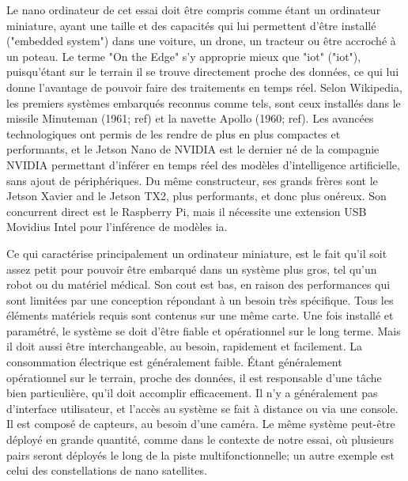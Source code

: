 ﻿\par Le nano ordinateur de cet essai doit être compris comme étant un ordinateur miniature, ayant une taille et des capacités qui lui permettent d'être installé ("embedded system") dans une voiture, un drone, un tracteur ou être accroché à un poteau. Le terme "On the Edge" s'y approprie mieux que "\acrshort{iot}" ("\acrlong{iot}"), puisqu'étant sur le terrain il se trouve directement proche des données, ce qui lui donne l'avantage de pouvoir faire des traitements en temps réel. Selon Wikipedia, les premiers systèmes embarqués reconnus comme tels, sont ceux installés dans le missile Minuteman (1961; ref) et la navette Apollo (1960; ref). Les avancées technologiques ont permis de les rendre de plus en plus compactes et performants, et le Jetson Nano de NVIDIA est le dernier né de la compagnie NVIDIA permettant d'inférer en temps réel des modèles d'intelligence artificielle, sans ajout de périphériques. Du même constructeur, ses grands frères sont le Jetson Xavier and le Jetson TX2, plus performants, et donc plus onéreux. Son concurrent direct est le Raspberry Pi, mais il nécessite une extension USB Movidius Intel pour l'inférence de modèles \acrshort{ia}. 
\par Ce qui caractérise principalement un ordinateur miniature, est le fait qu'il soit assez petit pour pouvoir être embarqué dans un système plus gros, tel qu'un robot ou du matériel médical. Son cout est bas, en raison des performances qui sont limitées par une conception répondant à un besoin très spécifique. Tous les éléments matériels requis sont contenus sur une même carte.  Une fois installé et paramétré, le système se doit d'être fiable et opérationnel sur le long terme. Mais il doit aussi être interchangeable, au besoin, rapidement et facilement. La consommation électrique est généralement faible. Étant généralement opérationnel sur le terrain, proche des données, il est responsable d'une tâche bien particulière, qu'il doit accomplir efficacement. Il n'y a généralement pas d'interface utilisateur, et l'accès au système se fait à distance ou via une console. Il est composé de capteurs, au besoin d'une caméra. Le même système peut-être déployé en grande quantité, comme dans le contexte de notre essai, où plusieurs pairs seront déployés le long de la piste multifonctionnelle; un autre exemple est celui des constellations de nano satellites.

